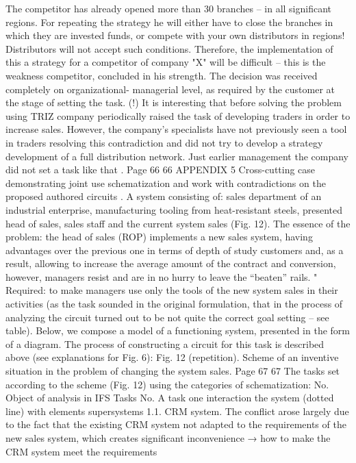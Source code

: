 The competitor has already opened more than 30 branches -- in all significant regions. For
repeating the strategy he will either have to close the branches in which they are invested
funds, or compete with your own distributors in
regions! Distributors will not accept such conditions. Therefore, the implementation of this
a strategy for a competitor of company "X" will be difficult -- this is the weakness
competitor, concluded in his strength. The decision was received completely on organizational-
managerial level, as required by the customer at the stage of setting the task.
(!) It is interesting that before solving the problem using TRIZ company
periodically raised the task of developing traders in order to increase
sales. However, the company's specialists have not previously seen a tool in traders
resolving this contradiction and did not try to develop a strategy
development of a full distribution network. Just earlier management
the company did not set a task like that .
Page 66
66
APPENDIX 5
Cross-cutting case demonstrating joint use
schematization and work with contradictions on the proposed
authored circuits .
A system consisting of:
sales department of an industrial enterprise,
manufacturing tooling from heat-resistant steels, presented
head of sales, sales staff and the current system
sales (Fig. 12).
The essence of the problem: the head of sales (ROP) implements a new sales system,
having advantages over the previous one in terms of depth of study
customers and, as a result, allowing to increase the average amount of the contract and
conversion, however, managers resist and are in no hurry to leave the “beaten”
rails. "
Required: to make managers use only the tools of the new system
sales in their activities (as the task sounded in the original formulation, that in
the process of analyzing the circuit turned out to be not quite the correct goal setting -- see table).
Below, we compose a model of a functioning system, presented in the form of a diagram.
The process of constructing a circuit for this task is described above (see explanations for Fig. 6):
Fig. 12 (repetition). Scheme of an inventive situation in the problem of changing the system
sales.
Page 67
67
The tasks set according to the scheme (Fig. 12) using the categories of schematization:
No.
Object of analysis in
IFS
Tasks
No.
A task
one
interaction
the system
(dotted line) with
elements
supersystems
1.1.
CRM system. The conflict arose largely due to the fact that the existing CRM system
not adapted to the requirements of the new sales system, which creates significant
inconvenience → how to make the CRM system meet the requirements
